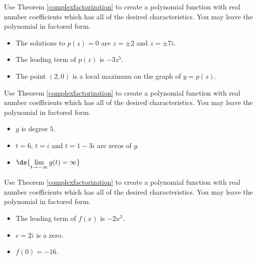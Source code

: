 \documentclass{ximera}
\begin{document}
\begin{problem}
Use Theorem \ref{complexfactorization} to create a polynomial function with real number coefficients which has all of the desired characteristics.  You may leave the polynomial in factored form.

\begin{itemize}

\item The solutions to $p(z) = 0$ are $z = \pm 2$ and $z=\pm 7i$.
\item The leading term of $p(z)$ is $-3z^5$.
\item The point $(2,0)$ is a local maximum on the graph of $y=p(z)$.

\end{itemize}
\end{problem}

\begin{problem}
Use Theorem \ref{complexfactorization} to create a polynomial function with real number coefficients which has all of the desired characteristics.  You may leave the polynomial in factored form.

\begin{itemize}

\item $g$ is degree $5$.
\item $t=6$, $t = i$ and $t = 1-3i$ are zeros of $g$.
\item $\ds{\lim_{t \rightarrow -\infty} g(t) = \infty}$ 

\end{itemize}
\end{problem}

\begin{problem}
Use Theorem \ref{complexfactorization} to create a polynomial function with real number coefficients which has all of the desired characteristics.  You may leave the polynomial in factored form.

\begin{itemize}

\item The leading term of $f(x)$ is $-2x^3$.
\item $c=2i$ is a zero.
\item $f(0) = -16$.

\end{itemize}
\end{problem}
\end{document}
